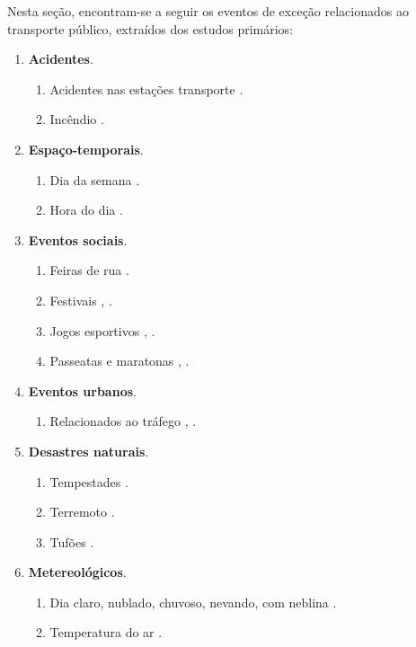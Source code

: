 \documentclass[
	12pt,				%
	oneside,			%
	a4paper,			%
	english,			%
	brazil				%
	]{abntex2ppgsi}
\begin{document}
{{Nesta seção, encontram-se a seguir os eventos de exceção relacionados ao transporte público, extraídos dos estudos primários:

\begin{enumerate}
\item \textbf{Acidentes}.
\begin{enumerate}
\item Acidentes nas estações transporte \cite{Itoh2016}.
\item Incêndio \cite{Itoh2016}.
\end{enumerate}

\item \textbf{Espaço-temporais}.
\begin{enumerate}
\item Dia da semana \cite{Chen2016}.
\item Hora do dia \cite{Chen2016}.
\end{enumerate}

\item \textbf{Eventos sociais}.
\begin{enumerate}
\item Feiras de rua \cite{Chen2016}.
\item Festivais \cite{Chen2016}, \cite{Lecue2014}.
\item Jogos esportivos \cite{Chen2016}, \cite{Gal-Tzur2014}.
\item Passeatas e maratonas \cite{Chen2016}, \cite{Itoh2016}.
\end{enumerate}

\item \textbf{Eventos urbanos}.
\begin{enumerate}
\item Relacionados ao tráfego \cite{Chen2016}, \cite{Lecue2014}.
\end{enumerate}

\item \textbf{Desastres naturais}.
\begin{enumerate}
\item Tempestades \cite{Itoh2016}.
\item Terremoto \cite{Itoh2016}.
\item Tufões \cite{Itoh2016}.
\end{enumerate}

\item \textbf{Metereológicos}.
\begin{enumerate}
\item Dia claro, nublado, chuvoso, nevando, com neblina \cite{Chen2016}.
\item Temperatura do ar \cite{Chen2016}.
\end{enumerate}


\end{enumerate}}}
\end{document}
